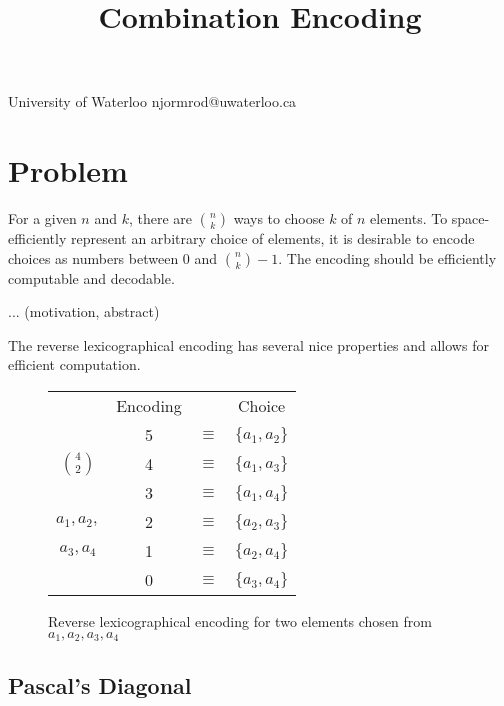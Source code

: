 \documentclass[preprint]{sigplanconf}
\begin{document}
	\title{Combination Encoding}
	           {University of Waterloo}
	           {njormrod@uwaterloo.ca}
	\maketitle
	

	\section{Problem}
	
	For a given $n$ and $k$, there are $\binom{n}{k}$ ways to choose $k$ of $n$ elements.
	To space-efficiently represent an arbitrary choice of elements, it is desirable to encode choices as numbers between $0$ and $\binom{n}{k}-1$.
	The encoding should be efficiently computable and decodable.
	
	... (motivation, abstract)
	
	The reverse lexicographical encoding has several nice properties and allows for efficient computation.

		
	\begin{figure}[!ht]
		\begin{center}	
		\begin{tabular}{c|ccc}
			& Encoding & & Choice \\
			\cline{2-4}
			\multirow{3}{*}{$\binom{4}{2}$}
			& 5 & $\equiv$ & $\{a_1, a_2\}$ \\
			& 4 & $\equiv$ & $\{a_1, a_3\}$ \\
			& 3 & $\equiv$ & $\{a_1, a_4\}$ \\
			$a_1, a_2,$ 
			& 2 & $\equiv$ & $\{a_2, a_3\}$ \\
			$a_3, a_4$
			& 1 & $\equiv$ & $\{a_2, a_4\}$ \\
			& 0 & $\equiv$ & $\{a_3, a_4\}$ \\
		\end{tabular}
		\caption{Reverse lexicographical encoding for two elements chosen from $a_1,a_2,a_3,a_4$}
		\label{Ex}
		\end{center}
	\end{figure}
	
	
	\subsection{Pascal's Diagonal}
	
\end{document}
